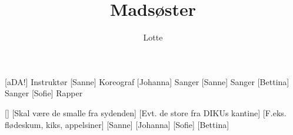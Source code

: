 \documentclass[a4paper,11pt]{article}
\title{Madsøster}
\author{Lotte}
\begin{document}
\maketitle

\begin{roles}
[aDA!] Instruktør
[Sanne] Koreograf
[Johanna] Sanger
[Sanne] Sanger
[Bettina] Sanger
[Sofie] Rapper
\end{roles}

\begin{props}
[]
[Skal være de smalle fra sydenden]
[Evt. de store fra DIKUs kantine]
[F.eks. flødeskum, kiks, appelsiner]
[Sanne]
[Johanna]
[Sofie]
[Bettina]
\end{props}
\end{document}
